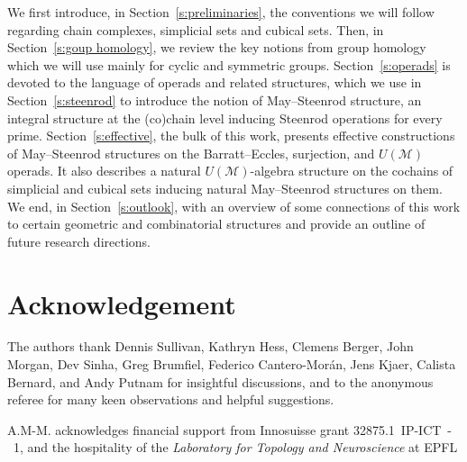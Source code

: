 We first introduce, in Section~\ref{s:preliminaries}, the conventions we will follow regarding chain complexes, simplicial sets and cubical sets.
Then, in Section~\ref{s:goup homology}, we review the key notions from group homology which we will use mainly for cyclic and symmetric groups.
Section~\ref{s:operads} is devoted to the language of operads and related structures, which we use in Section~\ref{s:steenrod} to introduce the notion of May--Steenrod structure, an integral structure at the (co)chain level inducing Steenrod operations for every prime.
Section~\ref{s:effective}, the bulk of this work, presents effective constructions of May--Steenrod structures on the Barratt--Eccles, surjection, and $U(\mathcal M)$ operads.
It also describes a natural $U(\mathcal M)$-algebra structure on the cochains of simplicial and cubical sets inducing natural May--Steenrod structures on them.
We end, in Section~\ref{s:outlook}, with an overview of some connections of this work to certain geometric and combinatorial structures and provide an outline of future research directions.

\section*{Acknowledgement}

The authors thank Dennis Sullivan, Kathryn Hess, Clemens Berger, John Morgan, Dev Sinha, Greg Brumfiel, Federico Cantero-Mor\'an, Jens Kjaer, Calista Bernard, and Andy Putnam for insightful discussions, and to the anonymous referee for many keen observations and helpful suggestions.

A.M-M. acknowledges financial support from Innosuisse grant \mbox{32875.1 IP-ICT - 1}, and the hospitality of the \textit{Laboratory for Topology and Neuroscience} at EPFL